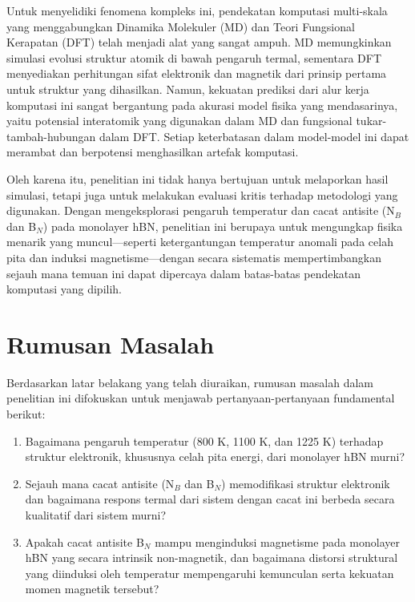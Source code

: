 Untuk menyelidiki fenomena kompleks ini, pendekatan komputasi multi-skala yang menggabungkan Dinamika Molekuler (MD) dan Teori Fungsional Kerapatan (DFT) telah menjadi alat yang sangat ampuh. MD memungkinkan simulasi evolusi struktur atomik di bawah pengaruh termal, sementara DFT menyediakan perhitungan sifat elektronik dan magnetik dari prinsip pertama untuk struktur yang dihasilkan. Namun, kekuatan prediksi dari alur kerja komputasi ini sangat bergantung pada akurasi model fisika yang mendasarinya, yaitu potensial interatomik yang digunakan dalam MD dan fungsional tukar-tambah-hubungan dalam DFT. Setiap keterbatasan dalam model-model ini dapat merambat dan berpotensi menghasilkan artefak komputasi.

Oleh karena itu, penelitian ini tidak hanya bertujuan untuk melaporkan hasil simulasi, tetapi juga untuk melakukan evaluasi kritis terhadap metodologi yang digunakan. Dengan mengeksplorasi pengaruh temperatur dan cacat antisite (N$_B$ dan B$_N$) pada monolayer hBN, penelitian ini berupaya untuk mengungkap fisika menarik yang muncul—seperti ketergantungan temperatur anomali pada celah pita dan induksi magnetisme—dengan secara sistematis mempertimbangkan sejauh mana temuan ini dapat dipercaya dalam batas-batas pendekatan komputasi yang dipilih.

\section{Rumusan Masalah}
Berdasarkan latar belakang yang telah diuraikan, rumusan masalah dalam penelitian ini difokuskan untuk menjawab pertanyaan-pertanyaan fundamental berikut:
\begin{enumerate}
    \item Bagaimana pengaruh temperatur (800 K, 1100 K, dan 1225 K) terhadap struktur elektronik, khususnya celah pita energi, dari monolayer hBN murni?
    \item Sejauh mana cacat antisite (N$_B$ dan B$_N$) memodifikasi struktur elektronik dan bagaimana respons termal dari sistem dengan cacat ini berbeda secara kualitatif dari sistem murni?
    \item Apakah cacat antisite B$_N$ mampu menginduksi magnetisme pada monolayer hBN yang secara intrinsik non-magnetik, dan bagaimana distorsi struktural yang diinduksi oleh temperatur mempengaruhi kemunculan serta kekuatan momen magnetik tersebut?
\end{enumerate}

